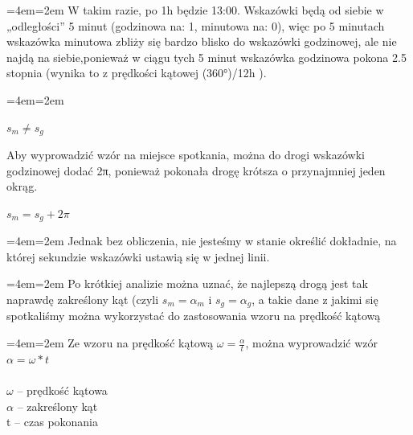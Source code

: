 \documentclass[12pt,a4paper]{article}
\newenvironment{blockquote}{%
  \par%
  \medskip
  \leftskip=4em\rightskip=2em%
  \noindent\ignorespaces}{%
  \par\medskip}
\begin{document}
            \begin{blockquote}
                W takim razie, po 1h będzie 13:00. Wskazówki będą od siebie w „odległości” 5 minut (godzinowa na: 1, minutowa na: 0), więc po 5 minutach wskazówka minutowa zbliży się bardzo blisko do wskazówki godzinowej, ale nie najdą na siebie,ponieważ w ciągu tych 5 minut wskazówka godzinowa pokona 2.5 stopnia (wynika to z prędkości kątowej (360°)/12h ).
             \end{blockquote}
             
             \begin{blockquote}
                \begin{center}
                  $  s_{m} \neq s_{g}$ \\
                \end{center}
                  Aby wyprowadzić wzór na miejsce spotkania, można do drogi wskazówki godzinowej dodać 2π, ponieważ pokonała drogę krótsza o przynajmniej jeden okrąg.
                 \begin{center}
                  $  s_{m} = s_{g} + 2\pi$ \\
                \end{center}
            \end{blockquote}
            
            \begin{blockquote}
                Jednak bez obliczenia, nie jesteśmy w stanie określić dokładnie, na której sekundzie wskazówki ustawią się w jednej linii.
            \end{blockquote}
            
            \begin{blockquote}
                Po krótkiej analizie można uznać, że najlepszą drogą jest tak naprawdę zakreślony kąt (czyli $s_{m}=\alpha_{m}$
                i $s_{g}=α_{g}$, a takie dane z jakimi się spotkaliśmy można wykorzystać do zastosowania wzoru na prędkość kątową
            \end{blockquote}
            
            \begin{blockquote}
                Ze wzoru na prędkość kątową  $\omega= \frac{\alpha}{t} $, można wyprowadzić wzór $\alpha = \omega*t$ \\\\
                $\omega$ – prędkość kątowa \\
                $\alpha$ – zakreślony kąt \\
                t – czas pokonania
            \end{blockquote}
            
\end{document}
